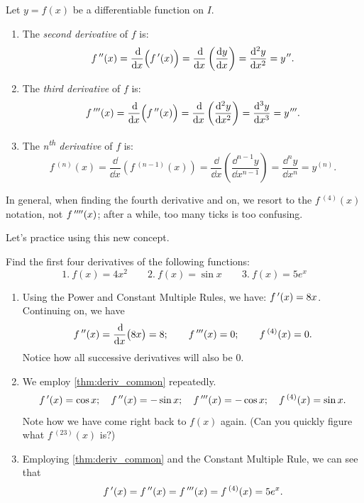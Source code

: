 \begin{definition}\label{def:Higher_Deriv}%
Let $y=f(x)$ be a differentiable function on $I$. 
	\begin{enumerate}
		\item	The \emph{second derivative} of $f$ is: 
			\[ \fp'(x) = \frac{\dd}{\dd x}\Bigl(\fp(x)\Bigr) = \frac{\dd}{\dd x}\left(\frac{\dd y}{\dd x}\right) = \frac{\dd^2y}{\dd x^2}=y\primeskip''.\]
		\item	The \emph{third derivative} of $f$ is: 
			\[ \fp''(x) = \frac{\dd}{\dd x}\Bigl(\fp'(x)\Bigr) = \frac{\dd}{\dd x}\left(\frac{\dd^2y}{\dd x^2}\right) = \frac{\dd^3y}{\dd x^3}=y\primeskip'''.\]
		\item	The \emph{n\textsuperscript{th} derivative} of $f$ is:
			\[ f\,^{(n)}(x) = \frac{\dd}{\dd x}\left(f\,^{(n-1)}(x)\right) = \frac{\dd}{\dd x}\left(\frac{\dd^{n-1}y}{\dd x^{n-1}}\right) = \frac{\dd^ny}{\dd x^n}=y^{(n)}.\]
	\end{enumerate}
\end{definition}


In general, when finding the fourth derivative and on, we resort to the $f\,^{(4)}(x)$ notation, not $f\,''''(x)$; after a while, too many ticks is too confusing.\bigskip

Let's practice using this new concept.

\begin{example}\label{ex_high_order}%
Find the first four derivatives of the following functions:
\[1.\ f(x) = 4x^2\qquad 2.\ f(x) = \sin x\qquad 3.\ f(x) = 5e^x\]
\solution
\begin{enumerate}
	\item	Using the Power and Constant Multiple Rules, we have: $f\,'(x) = 8x$. Continuing on, we have 
	\[f\,''(x) = \frac{\operatorname{d}\!}{\operatorname{d}\! x}\bigl(8x\bigr) = 8;\qquad f\,'''(x) = 0;\qquad f\,^{(4)}(x) = 0.\]
Notice how all successive derivatives will also be 0.
	\item	We employ \autoref{thm:deriv_common} repeatedly.
	\[f\,'(x) = \cos x;\quad f\,''(x) = -\sin x;\quad f\,'''(x) = -\cos x;\quad f\,^{(4)}(x) = \sin x.\]
	Note how we have come right back to $f(x)$ again. (Can you quickly figure what $f\,^{(23)}(x)$ is?)
	\item	Employing \autoref{thm:deriv_common} and the Constant Multiple Rule, we can see that
	\[f\,'(x) = f\,''(x) = f\,'''(x) = f\,^{(4)}(x) = 5e^x.\]
	\end{enumerate}
\end{example}

